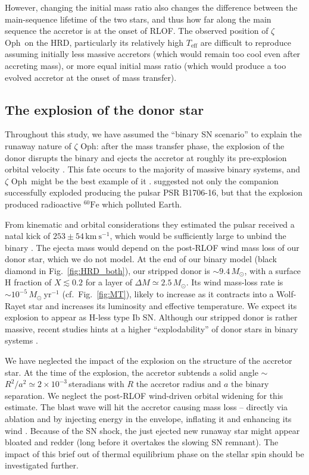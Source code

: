 \documentclass[twocolumn,twocolappendix,trackchanges]{aastex63}
\newcommand{\kms}{{\mathrm{km\ s^{-1}}}}
\DeclareRobustCommand{\Figref}[1]{Fig.~\ref{#1}}
\newcommand{\zoph}{$\zeta$ Oph}
\begin{document}
However, changing the initial mass ratio also changes the difference
between the main-sequence lifetime of the two stars, and thus how far
along the main sequence the accretor is at the onset of RLOF. The observed
position of \zoph\ on the HRD, particularly its relatively high
$T_\mathrm{eff}$ are difficult to reproduce assuming initially less
massive accretors (which would remain too cool even after accreting
mass), or more equal initial mass ratio (which would produce a too
evolved accretor at the onset of mass transfer).

\subsection{The explosion of the donor star}
\label{sec:SN_comp}

Throughout this study, we have assumed the ``binary SN scenario'' to
explain the runaway nature of \zoph:
after the mass transfer phase, the explosion of the donor disrupts the
binary and ejects the accretor at roughly its pre-explosion orbital
velocity \citep[e.g.,][]{renzo:19walk}. This fate occurs to the
majority of massive binary systems, and \zoph\ might be the best
example of it \citep[e.g.,][]{blaauw:52, blaauw:61,
  hoogerwerf:00}. \cite{neuhauser:20} suggested not only the companion
successfully exploded producing the pulsar PSR B1706-16, but that the
explosion produced radioactive $^{60}\mathrm{Fe}$ which polluted
Earth.

From kinematic and orbital considerations they estimated the pulsar
received a natal kick of
$253\pm54\,\kms$, which would be sufficiently large to unbind the binary \citep{kalogera:96, tauris:15}.  The ejecta mass would depend on the post-RLOF wind mass loss of our donor star, which we do not model.  At the end of our binary model (black diamond in \Figref{fig:HRD_both}), our stripped donor is
$\sim$$9.4\,M_\odot$, with a surface H fraction of $X\lesssim0.2$ for
a layer of $\Delta M \simeq 2.5\,M_\odot$.  Its wind mass-loss rate is
$\sim10^{-5}\,M_\odot \ \mathrm{yr^{-1}}$ (cf.~\Figref{fig:MT}),
likely to increase as it contracts into a Wolf-Rayet star and
increases its luminosity and effective temperature. We expect its
explosion to appear as H-less type Ib SN. Although our stripped donor
is rather massive, recent studies hints at a higher ``explodability''
of donor stars in binary systems \citep[e.g.,][]{schneider:21,
  laplace:21, vartanyan:21}.

We have neglected the impact of the explosion on the structure of the
accretor star. At the time of the explosion, the accretor subtends a
solid angle $\sim$$R^2/a^2\simeq
2\times10^{-3}$\,steradians with $R$ the accretor radius and
$a$ the binary separation. We neglect the post-RLOF wind-driven orbital widening for this estimate.  The blast wave will hit the accretor causing mass loss -- directly via ablation and by injecting energy in the envelope, inflating it and enhancing its wind \citep{wheeler:75, tauris:98, podsiadlowski:03, hirai:18}.  Because of the SN shock, the just ejected new runaway star might appear bloated and redder (long before it overtakes the slowing SN remnant). The impact of this brief out of thermal equilibrium phase on the stellar spin should be investigated further.
\end{document}
